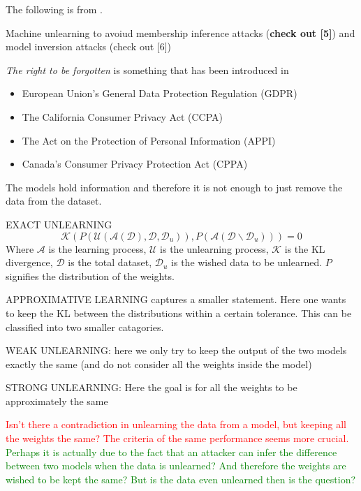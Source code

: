 

The following is from \cite{xu_machine_2023}.

Machine unlearning to avoiud membership inference attacks (\textbf{check out [5]}) and model inversion attacks (check out [6])

\textit{The right to be forgotten} is something that has been introduced in 
\begin{itemize}
    \item European Union's General Data Protection Regulation (GDPR)
    \item The California Consumer Privacy Act (CCPA)
    \item The Act on the Protection of Personal Information (APPI)
    \item Canada's Consumer Privacy Protection Act (CPPA)
\end{itemize}

The models hold information and therefore it is not enough to just remove the data from the dataset. 


EXACT UNLEARNING
\[
    \mathcal{K}(P(\mathcal{U}(\mathcal{A}(\mathcal{D}),\mathcal{D},\mathcal{D}_u)), 
    P(\mathcal{A}(\mathcal{D}\backslash\mathcal{D}_u)))=0
\]
Where $\mathcal{A}$ is the learning process, $\mathcal{U}$ is the unlearning process, $\mathcal{K}$ is the KL divergence, $\mathcal{D}$ is the total dataset, $\mathcal{D}_u$ is the wished data to be unlearned. $P$ signifies the distribution of the weights.



APPROXIMATIVE LEARNING captures a smaller statement. Here one wants to keep the KL between the distributions within a certain tolerance. This can be classified into two smaller catagories.

WEAK UNLEARNING: here we only try to keep the output of the two models exactly the same (and do not consider all the weights inside the model)

STRONG UNLEARNING: Here the goal is for all the weights to be approximately the same

\textcolor{red}{Isn't there a contradiction in unlearning the data from a model, but keeping all the weights the same? The criteria of the same performance seems more crucial. }
\textcolor{green}{Perhaps it is actually due to the fact that an attacker can infer the difference between two models when the data is unlearned? And therefore the weights are wished to be kept the same? But is the data even unlearned then is the question?}


